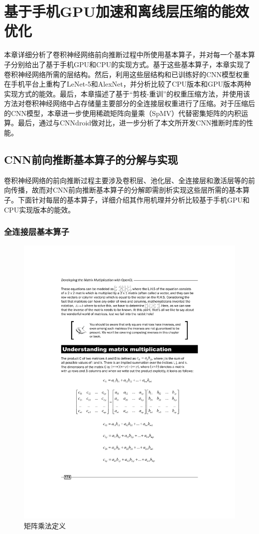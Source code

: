 \chapter{基于手机GPU加速和离线层压缩的能效优化}
\label{chapter:chapter3}

本章详细分析了卷积神经网络前向推断过程中所使用基本算子，并对每一个基本算子分别给出了基于手机GPU和CPU的实现方式。基于这些基本算子，本章实现了卷积神经网络所需的层结构。然后，利用这些层结构和已训练好的CNN模型权重在手机平台上重构了LeNet-5和AlexNet，并分析比较了CPU版本和GPU版本两种实现方式的能效。最后，本章描述了基于“剪枝-重训”的权重压缩方法，并使用该方法对卷积神经网络中占存储量主要部分的全连接层权重进行了压缩。对于压缩后的CNN模型，本章进一步使用稀疏矩阵向量乘（SpMV）代替密集矩阵的内积运算。最后，通过与CNNdroid\cite{latifi2016cnndroid}做对比，进一步分析了本文所开发CNN推断时库的性能。

\section{CNN前向推断基本算子的分解与实现}
\label{chapter:chapter3-1}
卷积神经网络的前向推断过程主要涉及卷积层、池化层、全连接层和激活层等的前向传播，故而对CNN前向推断基本算子的分解即需剖析实现这些层所需的基本算子。下面针对每层的基本算子，详细介绍其作用机理并分析比较基于手机GPU和CPU实现版本的能效。

\subsection{全连接层基本算子}

\begin{figure}[htbp]
    \begin{center}
    \includegraphics[height=0.5\textwidth]{figures/mat.pdf}
    \end{center}
    \caption{矩阵乘法定义}\label{figure:figure8}
\end{figure}

